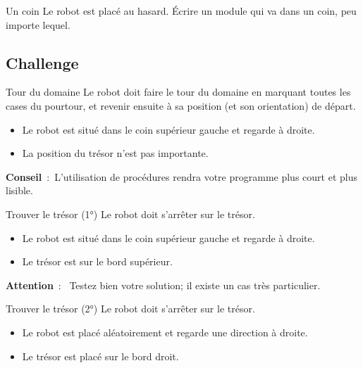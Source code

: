 		\begin{Exercice}{Un coin}
			Le robot est placé au hasard. 
			Écrire un module qui va dans un coin, peu
			importe lequel. 
		\end{Exercice}

	\subsection{Challenge}

		\begin{Exercice}{Tour du domaine}
			Le robot doit faire le tour du domaine en marquant toutes les cases du
			pourtour, et revenir ensuite à sa position (et son orientation) de
			départ.

			\begin{itemize}
			\item Le robot est situé dans le coin supérieur gauche et regarde à droite.
			\item La position du trésor n’est pas importante.
			\end{itemize}

			\textbf{Conseil}~:~L’utilisation de procédures rendra
			votre programme plus court et plus lisible.
		\end{Exercice}

		\begin{Exercice}{Trouver le trésor (1°)}
			Le robot doit s’arrêter sur le trésor.

			\begin{itemize}
			\item Le robot est situé dans le coin supérieur gauche et regarde à droite.
			\item Le trésor est sur le bord supérieur.
			\end{itemize}

			\textbf{Attention}~:~
			Testez bien votre solution; il existe un cas très particulier.
		\end{Exercice}

		\begin{Exercice}{Trouver le trésor (2°)}
			Le robot doit s’arrêter sur le trésor.

			\begin{itemize}
			\item Le robot est placé aléatoirement et regarde une direction à droite.
			\item Le trésor est placé sur le bord droit.
			\end{itemize}
		\end{Exercice}

